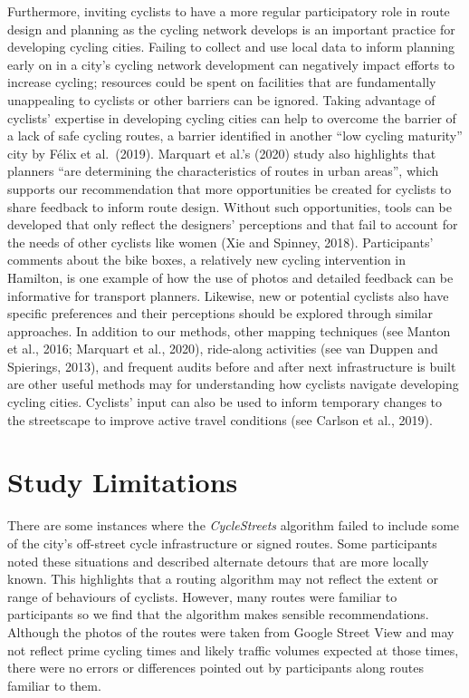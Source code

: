 \documentclass[]{elsarticle} %
\begin{document}
Furthermore, inviting cyclists to have a more regular participatory role
in route design and planning as the cycling network develops is an
important practice for developing cycling cities. Failing to collect and
use local data to inform planning early on in a city's cycling network
development can negatively impact efforts to increase cycling; resources
could be spent on facilities that are fundamentally unappealing to
cyclists or other barriers can be ignored. Taking advantage of cyclists'
expertise in developing cycling cities can help to overcome the barrier
of a lack of safe cycling routes, a barrier identified in another ``low
cycling maturity'' city by Félix et al.~(2019). Marquart et al.'s (2020)
study also highlights that planners ``are determining the
characteristics of routes in urban areas'', which supports our
recommendation that more opportunities be created for cyclists to share
feedback to inform route design. Without such opportunities, tools can
be developed that only reflect the designers' perceptions and that fail
to account for the needs of other cyclists like women (Xie and Spinney,
2018). Participants' comments about the bike boxes, a relatively new
cycling intervention in Hamilton, is one example of how the use of
photos and detailed feedback can be informative for transport planners.
Likewise, new or potential cyclists also have specific preferences and
their perceptions should be explored through similar approaches. In
addition to our methods, other mapping techniques (see Manton et al.,
2016; Marquart et al., 2020), ride-along activities (see van Duppen and
Spierings, 2013), and frequent audits before and after next
infrastructure is built are other useful methods may for understanding
how cyclists navigate developing cycling cities. Cyclists' input can
also be used to inform temporary changes to the streetscape to improve
active travel conditions (see Carlson et al., 2019).

\hypertarget{sec:limitations}{%
\section{Study Limitations}\label{sec:limitations}}

There are some instances where the \emph{CycleStreets} algorithm failed
to include some of the city's off-street cycle infrastructure or signed
routes. Some participants noted these situations and described alternate
detours that are more locally known. This highlights that a routing
algorithm may not reflect the extent or range of behaviours of cyclists.
However, many routes were familiar to participants so we find that the
algorithm makes sensible recommendations. Although the photos of the
routes were taken from Google Street View and may not reflect prime
cycling times and likely traffic volumes expected at those times, there
were no errors or differences pointed out by participants along routes
familiar to them.
\end{document}
